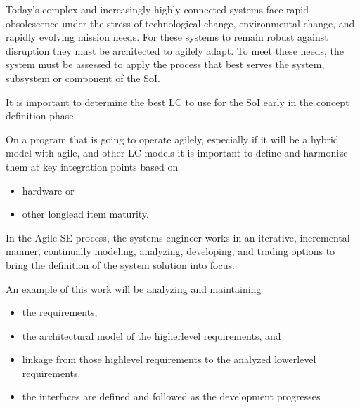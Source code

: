 \documentclass[letterpaper,10pt,english]{jupyterBook}
\begin{document}
\sphinxAtStartPar
Today’s complex and increasingly highly connected systems face rapid obsolescence under the stress of technological change, environmental change, and rapidly evolving mission needs.
For these systems to remain robust against disruption they must be architected to agilely adapt.
To meet these needs, the system must be assessed to apply the process that best serves the system, subsystem or component of the SoI.

\sphinxAtStartPar
It is important to determine the best LC to use for the SoI early in the concept definition phase.

\sphinxAtStartPar
On a program that is going to operate agilely, especially if it will be a hybrid model with agile, and other LC models it is
important to define and harmonize them at key integration points based on
\begin{itemize}
\item {} 
\sphinxAtStartPar
hardware or

\item {} 
\sphinxAtStartPar
other long\sphinxhyphen{}lead item maturity.

\end{itemize}

\sphinxAtStartPar
In the Agile SE process, the systems engineer works in an iterative, incremental manner, continually modeling, analyzing, developing, and trading options to bring the definition of the system solution into focus.

\sphinxAtStartPar
An example of this work will be analyzing and maintaining
\begin{itemize}
\item {} 
\sphinxAtStartPar
the requirements,

\item {} 
\sphinxAtStartPar
the architectural model of the higher\sphinxhyphen{}level requirements, and

\item {} 
\sphinxAtStartPar
linkage from those high\sphinxhyphen{}level requirements to the analyzed lower\sphinxhyphen{}level requirements.

\item {} 
\sphinxAtStartPar
the interfaces are defined and followed as the development progresses

\end{itemize}
\end{document}
